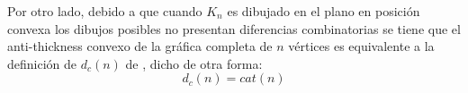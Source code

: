 Por otro lado, debido a que cuando $K_n$ es dibujado en el plano en posición convexa
los dibujos posibles no presentan diferencias combinatorias se tiene que el
anti-thickness convexo de la gráfica completa de $n$ vértices es equivalente a la definición
de $d_c(n)$ de \cite{Araujo2005}, dicho de otra forma:
\[ d_c(n) = cat(n)\]


%
%

